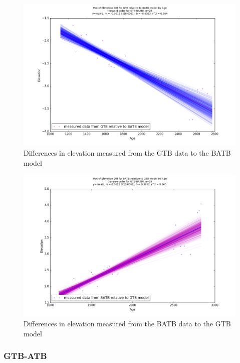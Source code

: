 \newpage

\begin{figure}[h]
	\includegraphics[width=0.9\linewidth]{data/bothNonZero/withinSeventyFivePercent/gias/theGIA_GTB_relative_to_BATB.png}
	\caption{Differences in elevation measured from the GTB data to the BATB model}
	\label{fig:gias_GTBxBATB}
\end{figure}
\newpage


\begin{figure}[h]
	\includegraphics[width=0.9\linewidth]{data/bothNonZero/withinSeventyFivePercent/gias/theGIA_BATB_relative_to_GTB.png}
	\caption{Differences in elevation measured from the BATB data to the GTB model}
	\label{fig:gias_BATBxGTB}
\end{figure}
\newpage







\subsubsection{GTB-ATB}

